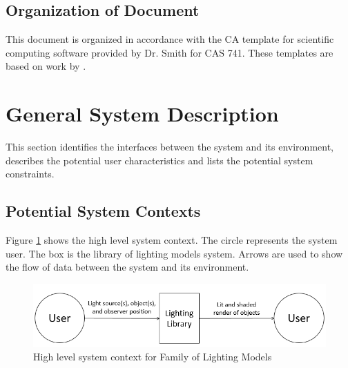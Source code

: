 \documentclass[12pt]{article}
\newcommand{\famname}{Family of Lighting Models} %
\begin{document}
\subsection{Organization of Document}
This document is organized in accordance with the CA template for scientific 
computing software provided by Dr. Smith for CAS 741. These templates are based 
on work by \citet{Smith2006}.

\section{General System Description}
This section identifies the interfaces between the system and its environment,
describes the potential user characteristics and lists the potential system
constraints.

\subsection{Potential System Contexts}
Figure \ref{fig:system-context} shows the high level system context. The circle 
represents the system user. The box is the library of lighting models system. 
Arrows are used to show the flow of data between the system and its environment.

\begin{figure}[h]
	\centering
	\includegraphics[scale=0.8]{./images/system-context}
	\caption{High level system context for \famname}
	\label{fig:system-context}
\end{figure}
\end{document}
